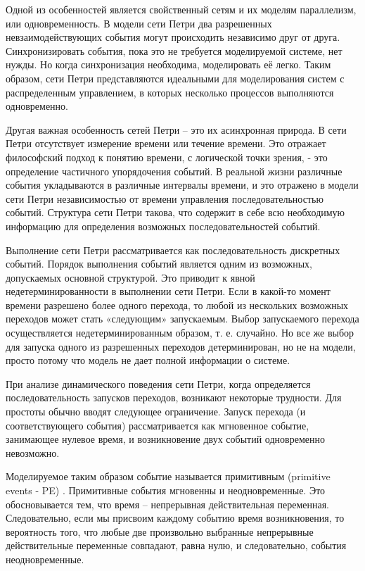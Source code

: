 Одной из особенностей является свойственный сетям и их моделям параллелизм, или одновременность. В модели сети Петри два разрешенных невзаимодействующих события могут происходить независимо друг от друга. Синхронизировать события, пока это не требуется моделируемой системе, нет нужды. Но когда синхронизация необходима, моделировать её легко. Таким образом, сети Петри представляются идеальными для моделирования систем с распределенным управлением, в которых несколько процессов выполняются одновременно.

Другая важная особенность сетей Петри – это их асинхронная природа. В сети Петри отсутствует измерение времени или течение времени. Это отражает философский подход к понятию времени, с логической точки зрения, - это определение частичного упорядочения событий. В реальной жизни различные события укладываются в различные интервалы времени, и это отражено в модели сети Петри независимостью от времени управления последовательностью событий. Структура сети Петри такова, что содержит в себе всю необходимую информацию для определения возможных последовательностей событий.

Выполнение сети Петри рассматривается как последовательность дискретных событий. Порядок выполнения событий является одним из возможных, допускаемых основной структурой. Это приводит к явной недетерминированности в выполнении сети Петри. Если в какой-то момент времени разрешено более одного перехода, то любой из нескольких возможных переходов может стать «следующим» запускаемым. Выбор запускаемого перехода осуществляется недетерминированным образом, т. е. случайно. Но все же выбор для запуска одного из разрешенных переходов детерминирован, но не на модели, просто потому что модель не дает полной информации о системе.

При анализе динамического поведения сети Петри, когда определяется последовательность запусков переходов, возникают некоторые трудности. Для простоты обычно вводят следующее ограничение. Запуск перехода (и соответствующего события) рассматривается как мгновенное событие, занимающее нулевое время, и возникновение двух событий одновременно невозможно.

Моделируемое таким образом событие называется примитивным (primitive events - PE) \cite{Peterson}. Примитивные события мгновенны и неодновременные. Это обосновывается тем, что время – непрерывная действительная переменная. Следовательно, если мы присвоим каждому событию время возникновения, то вероятность того, что любые две произвольно выбранные непрерывные действительные переменные совпадают, равна нулю, и следовательно, события неодновременные.

